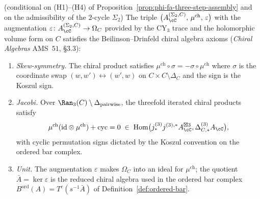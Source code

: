 \begin{theorem}
\label{wn:thm:agent3-bd-axioms}
\ClaimStatusConditional{} \textup{(conditional on (H1)--(H4) of Proposition~\ref{prop:phi-fa-three-step-assembly} and on the admissibility of the $2$-cycle $\Sigma_2$)}
The triple $\bigl(A^{(\Sigma_2,C)}_\cC,\,\mu^{\mathrm{ch}},\,\varepsilon\bigr)$ with the augmentation $\varepsilon\colon A^{(\Sigma_2,C)}_\cC\to\Omega_C$ provided by the CY$_3$ trace and the holomorphic volume form on $C$ satisfies the Beilinson--Drinfeld chiral algebra axioms \textup{(\emph{Chiral Algebras} AMS~$51$, \S$3.3$)}:
\begin{enumerate}[label=\textup{(BD-\arabic*)}]
\item \emph{Skew-symmetry.} The chiral product satisfies $\mu^{\mathrm{ch}}\circ\sigma=-\sigma\circ\mu^{\mathrm{ch}}$ where $\sigma$ is the coordinate swap $(w,w')\leftrightarrow(w',w)$ on $C\times C\setminus\Delta_C$ and the sign is the Koszul sign.
\item \emph{Jacobi.} Over $\Ran_3(C)\setminus\Delta_{\mathrm{pairwise}}$, the threefold iterated chiral products satisfy
\[
 \mu^{\mathrm{ch}}(\mathrm{id}\otimes\mu^{\mathrm{ch}})
 +\mathrm{cyc}=0
 \;\in\;\mathrm{Hom}\bigl(
 j^{(3)}_*j^{(3),*}A^{\boxtimes 3}_\cC,\Delta^{(3)}_{C,*}A_\cC
 \bigr),
\]
with cyclic permutation signs dictated by the Koszul convention on the ordered bar complex.
\item \emph{Unit.} The augmentation $\varepsilon$ makes $\Omega_C$ into an ideal for $\mu^{\mathrm{ch}}$; the quotient $\bar A=\ker\varepsilon$ is the reduced chiral algebra used in the ordered bar complex $B^{\mathrm{ord}}(A)=T^c(s^{-1}\bar A)$ of Definition~\ref{def:ordered-bar}.
\end{enumerate}
\end{theorem}

